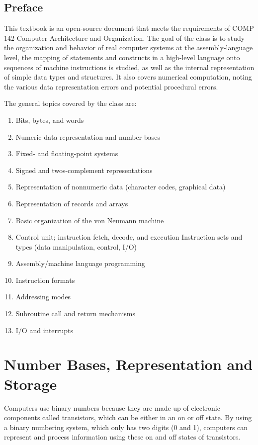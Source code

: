 \documentclass[11pt]{book}
\begin{document}
\section{Preface\label{sec:preface}}

This textbook is an open-source document that meets the requirements of COMP 142 Computer Architecture and Organization. The goal of the class is to study the organization and behavior of real computer systems at the assembly-language level, the mapping of statements and constructs in a high-level language onto sequences of machine instructions is studied, as well as the internal representation of simple data types and structures. It also covers numerical computation, noting the various data representation errors and potential procedural errors.

The general topics covered by the class are:

\begin{enumerate}
\item Bits, bytes, and words
\item Numeric data representation and number bases
\item Fixed- and floating-point systems
\item Signed and twos-complement representations
\item Representation of nonnumeric data (character codes, graphical data)
\item Representation of records and arrays
\item Basic organization of the von Neumann machine
\item Control unit; instruction fetch, decode, and execution
    Instruction sets and types (data manipulation, control, I/O)
\item Assembly/machine language programming
\item Instruction formats
\item Addressing modes
\item Subroutine call and return mechanisms
\item I/O and interrupts
\end{enumerate}

\chapter{Number Bases, Representation and Storage\label{sec:data}}

Computers use binary numbers because they are made up of electronic components called transistors, which can be either in an  on or off state. By using a binary numbering system, which only has two digits (0 and 1), computers can represent and process information using these on and off states of transistors.
\end{document}
